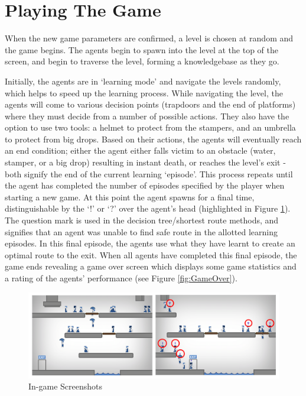 \documentclass[a4paper,oneside]{report}
\begin{document}
\section{Playing The Game}

When the new game parameters are confirmed, a level is chosen at random and the game begins. The agents begin to spawn into the level at the top of the screen, and begin to traverse the level, forming a knowledgebase as they go. 

Initially, the agents are in `learning mode' and navigate the levels randomly, which helps to speed up the learning process. While navigating the level, the agents will come to various decision points (trapdoors and the end of platforms) where they must decide from a number of possible actions. They also have the option to use two tools: a helmet to protect from the stampers, and an umbrella to protect from big drops. Based on their actions, the agents will eventually reach an end condition; either the agent either falls victim to an obstacle (water, stamper, or a big drop) resulting in instant death, or reaches the level's exit - both signify the end of the current learning `episode'. This process repeats until the agent has completed the number of episodes specified by the player when starting a new game. At this point the agent spawns for a final time, distinguishable by the `!'  or `?' over the agent's head (highlighted in Figure \ref{fig:GameScreen}). The question mark is used in the decision tree/shortest route methods, and signifies that an agent was unable to find safe route in the allotted learning episodes. In this final episode, the agents use what they have learnt to create an optimal route to the exit. When all agents have completed this final episode, the game ends revealing a game over screen which displays some game statistics and a rating of the agents' performance (see Figure \ref{fig:GameOver}).

\begin{figure}[H]
  \centering
    \includegraphics[width=140mm]{sources/images/Screen_Game}
    \caption{In-game Screenshots}
    \label{fig:GameScreen}
\end{figure}
\end{document}
